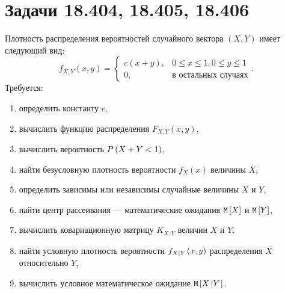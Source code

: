 \section*{Задачи 18.404, 18.405, 18.406}

Плотность распределения вероятностей случайного вектора $\left ( X, Y \right )$ имеет следующий вид:
$$
f_{X,Y}(x,y)
= \left \{
\begin{array}{ll}
    c ( x + y ), & 0 \le x \le 1, 0 \le y \le 1 \\
    0,           & \text{в остальных случаях}
\end{array}
\right .
.
$$
Требуется:
\begin{enumerate}
    \item определить константу $c$,
    \item вычислить функцию распределения $F_{X,Y}(x,y)$,
    \item вычислить вероятность $P \left ( X + Y < 1 \right )$,
    \item найти безусловную плотность вероятности $f_X(x)$ величины $X$,
    \item определить зависимы или независимы случайные величины $X$ и $Y$,
    \item найти центр рассеивания --- математические ожидания $\mathtt{M} \left [ X \right ]$ и $\mathtt{M} \left [ Y \right ]$,
    \item вычислить ковариационную матрицу $K_{X,Y}$ величин $X$ и $Y$.
    \item найти условную плотность вероятности $f_{X \left | Y \right .}(x,y)$ распределения $X$ относительно $Y$,
    \item вычислить условное математическое ожидание $\mathtt{M} \left [ X \left | Y \right . \right ]$.
\end{enumerate}


